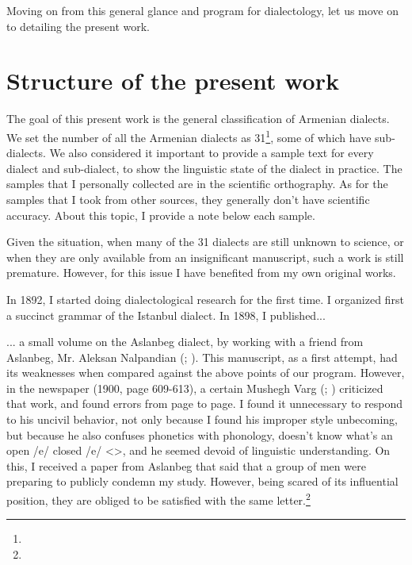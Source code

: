 Moving on from this general glance and program for dialectology, let us move on to detailing the present work. 

\section{Structure of the present work}

The goal of this present work is the general classification of Armenian dialects. We set the number of all the Armenian dialects as 31\footnote{}, some of which have sub-dialects. We also considered it important to provide a sample text for every dialect and sub-dialect, to show the linguistic state of the dialect in practice. The samples that I personally collected are in the scientific orthography. As for the samples that I took from other sources, they generally don't have scientific accuracy. About this topic, I provide a note below each sample. 

Given the situation, when many of the 31 dialects are still unknown to science, or when they are only available from an insignificant manuscript, such a work is still premature. However, for this issue I have benefited from my own original works. 

In 1892, I started doing dialectological research for the first time. I organized first a succinct grammar of the Istanbul dialect. In 1898, I published... 
\begin{adjarianpage}\label{page:13}\end{adjarianpage}%


... a small volume on the Aslanbeg dialect, by working with a friend from Aslanbeg, Mr. Aleksan Nalpandian (; ). This manuscript, as a first attempt, had its weaknesses when compared against the above points of our program. However, in the  newspaper (1900, page 609-613), a certain Mushegh Varg (; )  criticized that work, and found errors from page to page. I found it unnecessary to respond to his uncivil behavior, not only because I found his improper style unbecoming, but because he also  confuses phonetics with phonology, doesn't know what's an open /e/  closed /e/ <>, and he seemed devoid of linguistic understanding. On this, I received a paper from Aslanbeg that said that a group of men were preparing to publicly condemn my study. However, being scared of its influential position, they are obliged to be satisfied with the same letter.\footnote{} 

